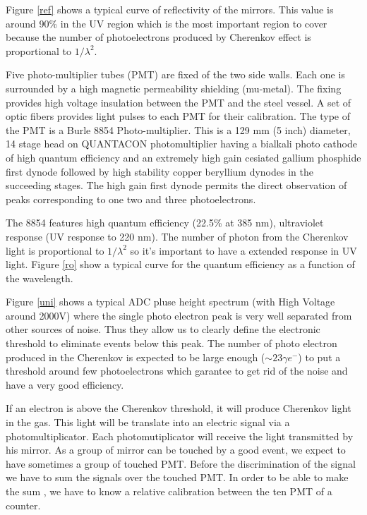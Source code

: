\documentclass[12pt]{article}
\begin{document}
Figure \ref{ref} shows a typical curve of reflectivity of the mirrors. This
value is around 90\% in the UV region which is the most important region
to cover because the number of photoelectrons produced by Cherenkov effect
is proportional to $1/\lambda^2$.


Five photo-multiplier tubes (PMT) are fixed of the two side walls. Each one
is surrounded by a high magnetic permeability shielding (mu-metal). The
fixing provides high voltage insulation between the PMT and the steel vessel.
A set of optic fibers provides light pulses to each PMT for their 
calibration.
The type of the PMT is a Burle 8854 Photo-multiplier. This is a 129 mm
 (5 inch) diameter, 14 stage head on QUANTACON photomultiplier having 
a bialkali photo cathode of high quantum efficiency and an extremely
 high gain cesiated gallium phosphide first
dynode followed by high stability copper beryllium dynodes in the succeeding
stages. The high gain first dynode permits the direct observation of peaks 
corresponding to one two and three photoelectrons. 

The 8854 features high quantum efficiency (22.5\% at 385 nm), 
ultraviolet response (UV response to 220 nm). The number of photon from the 
Cherenkov light is proportional to $1/\lambda^2$ so it's important to have a
extended response in UV light. Figure \ref{ro} show a typical curve for
the quantum efficiency as a function of the wavelength.


Figure \ref{uni} shows a typical ADC pluse height spectrum 
(with High Voltage around 2000V) where the single
photo electron peak is very well separated from other sources of noise. Thus
they allow us to clearly define the electronic threshold to eliminate events
below this peak. The number of photo electron produced in the Cherenkov is 
expected to be large enough ($\sim 23\gamma e^{-}$) to put a threshold around
few photoelectrons which garantee to get rid of the noise and have a very good
efficiency.


If an electron is above the Cherenkov threshold, it will produce Cherenkov 
light in the gas. This light will be translate into an electric signal 
via a photomultiplicator. Each photomutiplicator will receive the light 
transmitted by his mirror. As a group of mirror can be touched by a good 
event, we expect to have sometimes a group of touched PMT. Before the 
discrimination of the signal we have to sum the signals over the touched 
PMT. In order to be able to make the sum , we have to know a relative 
calibration between the ten PMT of a counter. 
\end{document}

